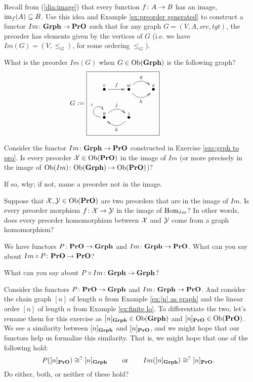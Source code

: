 \begin{exercise}\label{exc:grph to pro}
Recall from (\ref{dia:image}) that every function $f\colon A\rightarrow B$ has an image, $\textnormal{im}_f(A)\subseteq B$. Use this idea and Example \ref{ex:preorder generated} to construct a functor $Im\colon{\bf Grph}\rightarrow{\bf PrO}$ such that for any graph $G=(V,A,src,tgt)$, the preorder has elements given by the vertices of $G$ (i.e. we have $Im(G)=(V,\leq_G)$, for some ordering $\leq_G$).
\end{exercise}

\begin{exercise}
What is the preorder $Im(G)$ when $G\in\textnormal{Ob}({\bf Grph})$ is the following graph?
$$
G:=\parbox{2in}{\fbox{\xymatrix{\LMO{v}\ar[r]^f&\LMO{w}\ar@/_1pc/[r]_h\ar@/^1pc/[r]^g&\LMO{x}\\\LMO{y}\ar@(l,u)[]^i\ar@/^1pc/[r]^j&\LMO{z}\ar@/^1pc/[l]^k}}}
$$
\end{exercise}

\begin{exercise}
Consider the functor $Im\colon{\bf Grph}\rightarrow{\bf PrO}$ constructed in Exercise \ref{exc:grph to pro}.
\sexc Is every preorder $\mathcal{X}\in\textnormal{Ob}({\bf PrO})$ in the image of $Im$ (or more precisely in the image of $\textnormal{Ob}(Im)\colon\textnormal{Ob}({\bf Grph})\rightarrow\textnormal{Ob}({\bf PrO})$)?
\item If so, why; if not, name a preorder not in the image.
\item Suppose that $\mathcal{X},\mathcal{Y}\in\textnormal{Ob}({\bf PrO})$ are two preorders that are in the image of $Im$. Is every preorder morphism $f\colon\mathcal{X}\rightarrow\mathcal{Y}$ in the image of $\textnormal{Hom}_{Im}$? In other words, does every preorder homomorphism between $\mathcal{X}$ and $\mathcal{Y}$ come from a graph homomorphism?
\endsexc
\end{exercise}

\begin{exercise}
We have functors $P\colon{\bf PrO}\rightarrow{\bf Grph}$ and $Im\colon{\bf Grph}\rightarrow{\bf PrO}$.
\sexc What can you say about $Im\circ P\colon{\bf PrO}\rightarrow{\bf PrO}$?
\item What can you say about $P\circ Im\colon{\bf Grph}\rightarrow{\bf Grph}$?
\endsexc
\end{exercise}

\begin{exercise}
Consider the functors $P\colon{\bf PrO}\rightarrow{\bf Grph}$ and $Im\colon{\bf Grph}\rightarrow{\bf PrO}$. And consider the chain graph $[n]$ of length $n$ from Example \ref{ex:[n] as graph} and the linear order $[n]$ of length $n$ from Example \ref{ex:finite lo}. To differentiate the two, let's rename them for this exercise as $[n]_{{\bf Grph}}\in\textnormal{Ob}({\bf Grph})$ and $[n]_{{\bf PrO}}\in\textnormal{Ob}({\bf PrO})$. We see a similarity between $[n]_{{\bf Grph}}$ and $[n]_{{\bf PrO}}$, and we might hope that our functors help us formalize this similarity. That is, we might hope that one of the following hold: 
$$P([n]_{{\bf PrO}})\cong^? [n]_{{\bf Grph}}\hspace{.3in}\textnormal{or}\hspace{.3in} Im([n]_{{\bf Grph}})\cong^? [n]_{{\bf PrO}}.$$ 
Do either, both, or neither of these hold?
\end{exercise}

